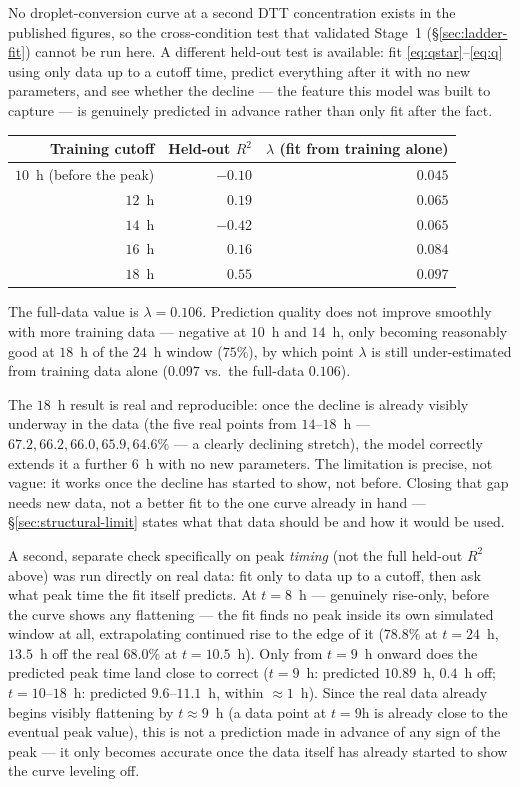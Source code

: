\documentclass[11pt]{article}
\begin{document}
No droplet-conversion curve at a second DTT concentration exists in the published figures, so
the cross-condition test that validated Stage~1 (\S\ref{sec:ladder-fit}) cannot be run here.
A different held-out test is available: fit \eqref{eq:qstar}--\eqref{eq:q} using only data up
to a cutoff time, predict everything after it with no new parameters, and see whether the
decline --- the feature this model was built to capture --- is genuinely predicted in advance
rather than only fit after the fact.
\begin{center}
\begin{tabular}{rrr}
\toprule
Training cutoff & Held-out $R^2$ & $\lambda$ (fit from training alone)\\
\midrule
$10$~h (before the peak) & $-0.10$ & $0.045$\\
$12$~h & $0.19$ & $0.065$\\
$14$~h & $-0.42$ & $0.065$\\
$16$~h & $0.16$ & $0.084$\\
$18$~h & $0.55$ & $0.097$\\
\bottomrule
\end{tabular}
\end{center}
The full-data value is $\lambda=0.106$. Prediction quality does not improve smoothly with
more training data --- negative at $10$~h and $14$~h, only becoming reasonably good at $18$~h
of the $24$~h window ($75\%$), by which point $\lambda$ is still under-estimated from training
data alone ($0.097$ vs.\ the full-data $0.106$).

The $18$~h result is real and reproducible: once the decline is
already visibly underway in the data (the five real points from $14$--$18$~h --- $67.2,66.2,
66.0,65.9,64.6\%$ --- a clearly declining stretch), the model correctly extends it a further
$6$~h with no new parameters. The limitation is precise, not vague: it works once the decline
has started to show, not before. Closing that gap needs new data, not a better fit to the one
curve already in hand --- \S\ref{sec:structural-limit} states what that data should be and how
it would be used.

A second, separate check specifically on peak \emph{timing} (not the full held-out $R^2$
above) was run directly on real data: fit only to data up to a cutoff, then ask what peak time
the fit itself predicts. At $t=8$~h --- genuinely rise-only, before the curve shows any
flattening --- the fit finds no peak inside its own simulated window at all, extrapolating
continued rise to the edge of it ($78.8\%$ at $t=24$~h, $13.5$~h off the real
$68.0\%$ at $t=10.5$~h). Only from $t=9$~h onward does the predicted peak time land close to
correct ($t=9$~h: predicted $10.89$~h, $0.4$~h off; $t=10$--$18$~h: predicted $9.6$--$11.1$~h,
within $\approx1$~h). Since the real data already begins visibly flattening by $t\approx9$~h
(a data point at $t=9$h is already close to the eventual peak value), this is not a prediction
made in advance of any sign of the peak --- it only becomes accurate once the data itself has
already started to show the curve leveling off.
\end{document}
